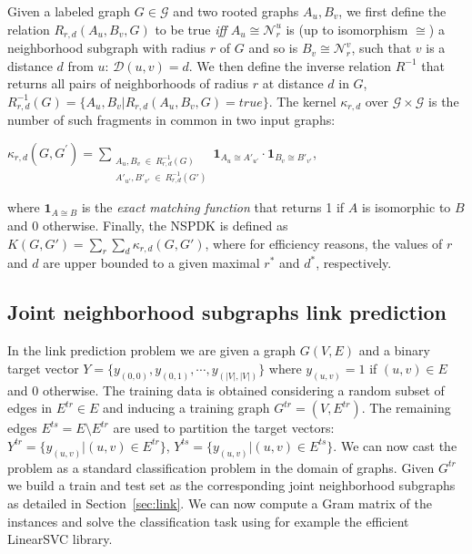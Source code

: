 \documentclass[runningheads,a4paper]{llncs}
\begin{document}
Given a labeled graph $G \in \mathcal{G}$ and two rooted graphs $A_u, B_v$, we first define the relation $R_{r,d}(A_u, B_v, G)$ to be true {\em iff} $A_u \cong \mathcal{N}_r^u$ is (up to isomorphism $\cong$) a neighborhood subgraph with radius $r$ of $G$ and so is $B_v \cong  \mathcal{N}_r^v$, such that $v$ is a distance $d$ from $u$: $\mathcal{D}(u,v)= d$. We then define the inverse relation $R^{-1}$ that returns all pairs of neighborhoods of radius $r$ at distance $d$ in $G$, $R^{-1}_{r,d}(G) = \lbrace A_u, B_v | R_{r,d}(A_u,B_v,G)=true\rbrace$. The kernel $\kappa_{r,d}$ over $\mathcal{G} \times \mathcal{G}$ is the number of such fragments in common in two input graphs:
\begin{center}
$\kappa_{r,d}(G,G^{'}) = 
\!\!\!\!\!\!\!\!\!\!\!\! 
\sum\limits_{\substack{A_u, B_v \ \in \ R_{r,d}^{-1}(G) \\ 
{A'}_{u'}, {B'}_{v'} \ \in \ R_{r,d}^{-1}(G')
}} \!\!\!\!\!\!\!\!\!\!\!\!  { { \textbf{1}_{A_{u} \cong A'_{u'}}} \cdot {
\textbf{1}_{B_{v} \cong B'_{v'}}} }$, 
\end{center}
\noindent where $\textbf{1}_{A \cong B}$ is the \textit{exact matching function} that returns 1 if $A$ is isomorphic to $B$ and 0 otherwise. Finally, the NSPDK is defined as $K(G,G') = \sum\limits_{r}{\sum\limits_{d}{\kappa_{r,d}(G,G')}}$, where for efficiency reasons, the values of $r$ and $d$ are upper bounded to a given maximal $r^*$ and $d^*$, respectively.


\subsection{Joint neighborhood subgraphs link prediction}

In the link prediction problem we are given a graph $G(V,E)$ and a binary target vector $Y=\{y_{(0,0)},y_{(0,1)}, \cdots, y_{(|V|,|V|)}\}$ where $y_{(u,v)}=1$ if $(u,v) \in E$ and 0 otherwise. The training data is obtained considering a random subset of edges in $E^{tr} \in E$ and inducing a training graph $G^{tr}=(V,E^{tr})$. The remaining edges $E^{ts} = E \setminus E^{tr}$ are used to partition the target vectors: $Y^{tr} = \{y_{(u,v)} | (u,v) \in E^{tr}\}$, $Y^{ts} = \{y_{(u,v)} | (u,v) \in E^{ts}\}$.
We can now cast the problem as a standard classification problem in the domain of graphs. Given $G^{tr}$ we build a train and test set as the corresponding joint neighborhood subgraphs as detailed in Section~\ref{sec:link}. 
We can now compute a Gram matrix of the instances and solve the classification task using for example the efficient LinearSVC library.
\end{document}
